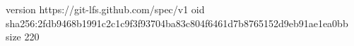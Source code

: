 version https://git-lfs.github.com/spec/v1
oid sha256:2fdb9468b1991c2c1c9f3f93704ba83c804f6461d7b8765152d9eb91ae1ea0bb
size 220
